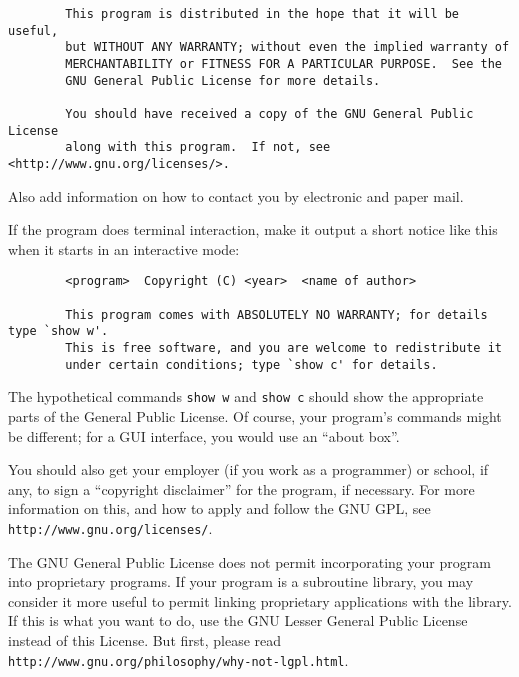 \begin{enumerate}
{\begin{verbatim}
		This program is distributed in the hope that it will be useful,
		but WITHOUT ANY WARRANTY; without even the implied warranty of
		MERCHANTABILITY or FITNESS FOR A PARTICULAR PURPOSE.  See the
		GNU General Public License for more details.
		
		You should have received a copy of the GNU General Public License
		along with this program.  If not, see <http://www.gnu.org/licenses/>.
		\end{verbatim}
	}
	
	Also add information on how to contact you by electronic and paper mail.
	
	If the program does terminal interaction, make it output a short
	notice like this when it starts in an interactive mode:
	
	{\footnotesize
		\begin{verbatim}
		<program>  Copyright (C) <year>  <name of author>
		
		This program comes with ABSOLUTELY NO WARRANTY; for details type `show w'.
		This is free software, and you are welcome to redistribute it
		under certain conditions; type `show c' for details.
		\end{verbatim}
	}
	
	The hypothetical commands \texttt{show w} and \texttt{show c} should show
	the appropriate
	parts of the General Public License.  Of course, your program's commands
	might be different; for a GUI interface, you would use an ``about box''.
	
	You should also get your employer (if you work as a programmer) or
	school, if any, to sign a ``copyright disclaimer'' for the program, if
	necessary.  For more information on this, and how to apply and follow
	the GNU GPL, see \texttt{http://www.gnu.org/licenses/}.
	
	The GNU General Public License does not permit incorporating your
	program into proprietary programs.  If your program is a subroutine
	library, you may consider it more useful to permit linking proprietary
	applications with the library.  If this is what you want to do, use
	the GNU Lesser General Public License instead of this License.  But
	first, please read \texttt{http://www.gnu.org/philosophy/why-not-lgpl.html}.
	
\end{enumerate}


